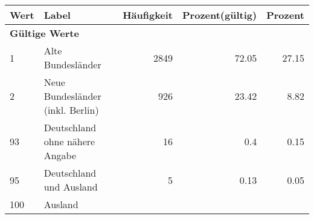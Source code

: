      \begin{longtable}{lXrrr}
     \toprule
     \textbf{Wert} & \textbf{Label} & \textbf{Häufigkeit} & \textbf{Prozent(gültig)} & \textbf{Prozent} \\
     \endhead
     \midrule
     \multicolumn{5}{l}{\textbf{Gültige Werte}}\\

     1 &
     \multicolumn{1}{X}{ Alte Bundesländer   } &


       \num{2849} &
       \num[round-mode=places,round-precision=2]{72,05} &
         \num[round-mode=places,round-precision=2]{27,15} \\

     2 &
     \multicolumn{1}{X}{ Neue Bundesländer (inkl. Berlin)   } &


       \num{926} &
       \num[round-mode=places,round-precision=2]{23,42} &
         \num[round-mode=places,round-precision=2]{8,82} \\

     93 &
     \multicolumn{1}{X}{ Deutschland ohne nähere Angabe   } &


       \num{16} &
       \num[round-mode=places,round-precision=2]{0,4} &
         \num[round-mode=places,round-precision=2]{0,15} \\

     95 &
     \multicolumn{1}{X}{ Deutschland und Ausland   } &


       \num{5} &
       \num[round-mode=places,round-precision=2]{0,13} &
         \num[round-mode=places,round-precision=2]{0,05} \\

     100 &
     \multicolumn{1}{X}{ Ausland   } &



\end{longtable}

